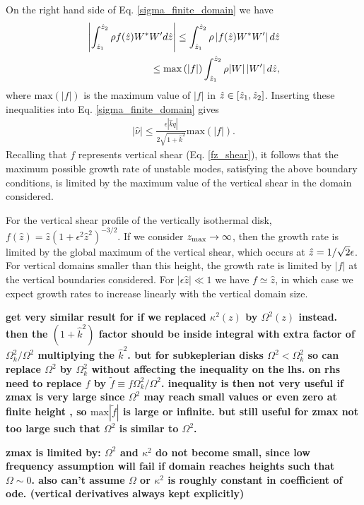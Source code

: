 On the right hand side of Eq. \ref{sigma_finite_domain} we have
\begin{align}
  \left|\int_{\hat{z}_1}^{\hat{z}_2}\rho
    f(\hat{z}) W^*W^\prime d\hat{z}\right|\leq \int_{\hat{z}_1}^{\hat{z}_2}\rho
  \left|f(\hat{z})W^*W^\prime \right|d\hat{z} \notag\\
  \leq
  \mathrm{max}\left(|f|\right)\int_{\hat{z}_1}^{\hat{z}_2}\rho
  |W|\left|W^\prime \right|d\hat{z},
\end{align}
where $\mathrm{max}(|f|)$ is the maximum value of $|f|$ in
$\hat{z}\in[\hat{z}_1,\hat{z}_2]$. Inserting these inequalities into
Eq. \ref{sigma_finite_domain} gives
\begin{align}\label{max_growth}
  |\hat{\nu}|\leq
  \frac{\epsilon |\hat{k} q|}{2\sqrt{1+\hat{k}^2}}\mathrm{max}(|f|). 
\end{align}
Recalling that $f$ represents vertical shear (Eq. \ref{fz_shear}), it
follows that the maximum possible growth rate of unstable modes,
satisfying the above boundary conditions, is limited by the maximum
value of the vertical shear in the domain considered. 

For the vertical shear profile of the vertically isothermal
disk, $f(\hat{z}) =
\hat{z}\left(1+\epsilon^2\hat{z}^2\right)^{-3/2}$. If we consider
$z_\mathrm{max}\to\infty$,  then the growth rate is limited by the global
maximum of the vertical shear, which occurs at $\hat{z}
=1/\sqrt{2}\epsilon$.  
For vertical domains smaller than this height, the growth rate is
limited by $|f|$ at the vertical boundaries considered. For 
$|\epsilon\hat{z}|\ll1$ we have $f\simeq \hat{z}$, in which case we
expect growth rates to increase linearly with the vertical domain
size.  


{\bf get very similar result for if we replaced $\kappa^2(z)$ by $\Omega^2(z)$ instead. then the $(1+\hat{k}^2)$ factor should be 
inside integral with extra factor of $\Omega_k^2/\Omega^2$ multiplying the $\hat{k}^2$. but for subkeplerian disks $\Omega^2<\Omega_k^2$ so can replace
$\Omega^2$ by $\Omega^2_k$ without affecting the inequality on the lhs. on rhs need to replace $f$ by $\tilde{f}\equiv f\Omega_k^2/\Omega^2$. inequality is then not very 
useful if zmax is very large since $\Omega^2$ may reach small values or even zero at finite height , so $\mathrm{max}|\tilde{f}|$ is large or infinite. 
but still useful for zmax not too large such that $\Omega^2$ is similar to $\Omega^2$.}

{\bf zmax is limited by: $\Omega^2$ and $\kappa^2$ do not become small, since low frequency assumption will fail if domain reaches heights such that $\Omega\sim0$. also can't assume
$\Omega$ or $\kappa^2$ is roughly constant in coefficient of ode. (vertical derivatives always kept explicitly) 	
}

